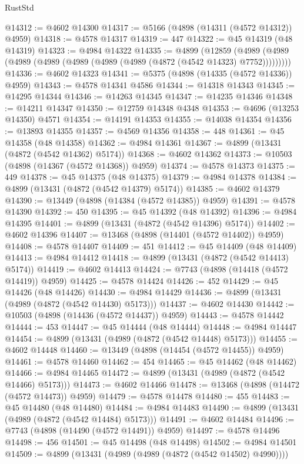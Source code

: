 \begin{lexlean}{RustStd}
\begin{coremodule}
@14312 := @4602 @14300
@14317 := @5166 (@4898 (@14311 (@4572 @14312)) @4959)
@14318 := @4578 @14317
@14319 := 447
@14322 := @45 @14319 (@48 @14319)
@14323 := @4984 @14322
@14335 := @4899
    (@12859 (@4989 (@4989 (@4989 (@4989 (@4989 (@4989 (@4989 (@4872 (@4542 @14323) @7752)))))))))
@14336 := @4602 @14323
@14341 := @5375 (@4898 (@14335 (@4572 @14336)) @4959)
@14343 := @4578 @14341 @4586
@14344 := @14318 @14343
@14345 := @14295 @14344
@14346 := @14263 @14345
@14347 := @14235 @14346
@14348 := @14211 @14347
@14350 := @12759 @14348 @4348
@14353 := @4696 (@13253 @14350) @4571
@14354 := @14191 @14353
@14355 := @14038 @14354
@14356 := @13893 @14355
@14357 := @4569 @14356
@14358 := 448
@14361 := @45 @14358 (@48 @14358)
@14362 := @4984 @14361
@14367 := @4899 (@13431 (@4872 (@4542 @14362) @5174))
@14368 := @4602 @14362
@14373 := @10503 (@4898 (@14367 (@4572 @14368)) @4959)
@14374 := @4578 @14373
@14375 := 449
@14378 := @45 @14375 (@48 @14375)
@14379 := @4984 @14378
@14384 := @4899 (@13431 (@4872 (@4542 @14379) @5174))
@14385 := @4602 @14379
@14390 := @13449 (@4898 (@14384 (@4572 @14385)) @4959)
@14391 := @4578 @14390
@14392 := 450
@14395 := @45 @14392 (@48 @14392)
@14396 := @4984 @14395
@14401 := @4899 (@13431 (@4872 (@4542 @14396) @5174))
@14402 := @4602 @14396
@14407 := @13468 (@4898 (@14401 (@4572 @14402)) @4959)
@14408 := @4578 @14407
@14409 := 451
@14412 := @45 @14409 (@48 @14409)
@14413 := @4984 @14412
@14418 := @4899 (@13431 (@4872 (@4542 @14413) @5174))
@14419 := @4602 @14413
@14424 := @7743 (@4898 (@14418 (@4572 @14419)) @4959)
@14425 := @4578 @14424
@14426 := 452
@14429 := @45 @14426 (@48 @14426)
@14430 := @4984 @14429
@14436 := @4899 (@13431 (@4989 (@4872 (@4542 @14430) @5173)))
@14437 := @4602 @14430
@14442 := @10503 (@4898 (@14436 (@4572 @14437)) @4959)
@14443 := @4578 @14442
@14444 := 453
@14447 := @45 @14444 (@48 @14444)
@14448 := @4984 @14447
@14454 := @4899 (@13431 (@4989 (@4872 (@4542 @14448) @5173)))
@14455 := @4602 @14448
@14460 := @13449 (@4898 (@14454 (@4572 @14455)) @4959)
@14461 := @4578 @14460
@14462 := 454
@14465 := @45 @14462 (@48 @14462)
@14466 := @4984 @14465
@14472 := @4899 (@13431 (@4989 (@4872 (@4542 @14466) @5173)))
@14473 := @4602 @14466
@14478 := @13468 (@4898 (@14472 (@4572 @14473)) @4959)
@14479 := @4578 @14478
@14480 := 455
@14483 := @45 @14480 (@48 @14480)
@14484 := @4984 @14483
@14490 := @4899 (@13431 (@4989 (@4872 (@4542 @14484) @5173)))
@14491 := @4602 @14484
@14496 := @7743 (@4898 (@14490 (@4572 @14491)) @4959)
@14497 := @4578 @14496
@14498 := 456
@14501 := @45 @14498 (@48 @14498)
@14502 := @4984 @14501
@14509 := @4899 (@13431 (@4989 (@4989 (@4872 (@4542 @14502) @4990))))

\end{coremodule}
\end{lexlean}
